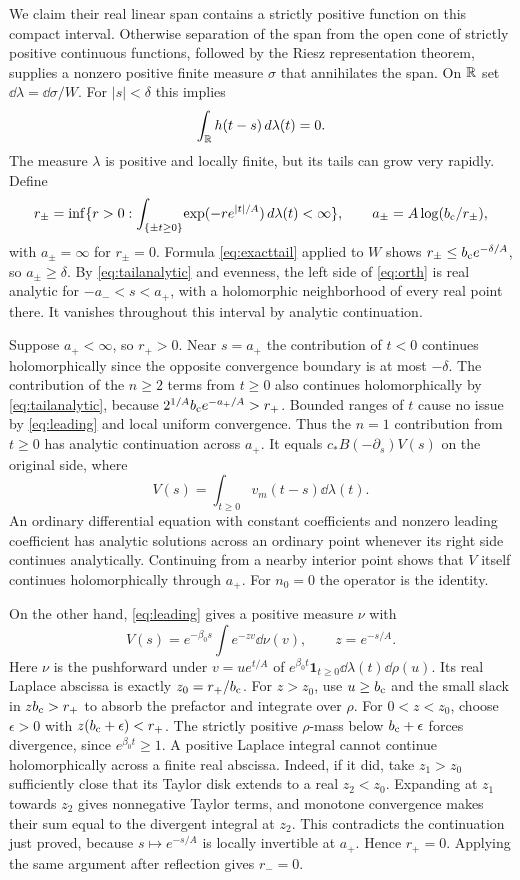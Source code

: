 We claim their real linear span contains a strictly positive function on this compact interval. Otherwise separation of the span from the open cone of strictly positive continuous functions, followed by the Riesz representation theorem, supplies a nonzero positive finite measure $\sigma$ that annihilates the span. On $\mathbb R$ set $\dd\lambda=\dd\sigma/W$. For $|s|<\delta$ this implies
\begin{equation}
                 \int_\mathbb R h(t-s)\,d\lambda(t)=0 .             \label{eq:orth}
\end{equation}
The measure $\lambda$ is positive and locally finite, but its tails can grow very rapidly. Define
\[
 r_\pm=\inf\{r>0:\int_{\{\pm t\ge0\}}\!
          \exp(-r e^{|t|/A})\,d\lambda(t)<\infty\},\qquad
 a_\pm=A\log(b_{\mathrm c}/r_\pm),
\]
with $a_\pm=\infty$ for $r_\pm=0$. Formula \eqref{eq:exacttail} applied to $W$ shows $r_\pm\le b_{\mathrm c} e^{-\delta/A}$, so $a_\pm\ge\delta$. By \eqref{eq:tailanalytic} and evenness, the left side of \eqref{eq:orth} is real analytic for $-a_-<s<a_+$, with a holomorphic neighborhood of every real point there. It vanishes throughout this interval by analytic continuation.

Suppose $a_+<\infty$, so $r_+>0$. Near $s=a_+$ the contribution of $t<0$ continues holomorphically since the opposite convergence boundary is at most $-\delta$. The contribution of the $n\ge2$ terms from $t\ge0$ also continues holomorphically by \eqref{eq:tailanalytic}, because
$2^{1/A}b_{\mathrm c} e^{-a_+/A}>r_+$.
Bounded ranges of $t$ cause no issue by \eqref{eq:leading} and local uniform convergence. Thus the $n=1$ contribution from $t\ge0$ has analytic continuation across $a_+$. It equals $c_*B(-\partial_s)V(s)$ on the original side, where
\[
 V(s)=\int_{t\ge0}v_m(t-s)\dd\lambda(t).
\]
An ordinary differential equation with constant coefficients and nonzero leading coefficient has analytic solutions across an ordinary point whenever its right side continues analytically. Continuing from a nearby interior point shows that $V$ itself continues holomorphically through $a_+$. For $n_0=0$ the operator is the identity.

On the other hand, \eqref{eq:leading} gives a positive measure $\nu$ with
\[
 V(s)=e^{-\beta_0s}\int e^{-zv}\dd\nu(v),\qquad z=e^{-s/A}.
\]
Here $\nu$ is the pushforward under $v=u e^{t/A}$ of
$e^{\beta_0 t}\mathbf1_{t\ge0}\dd\lambda(t)\dd\rho(u)$. Its real Laplace abscissa is exactly $z_0=r_+/b_{\mathrm c}$. For $z>z_0$, use $u\ge b_{\mathrm c}$ and the small slack in $zb_{\mathrm c}>r_+$ to absorb the prefactor and integrate over $\rho$. For $0<z<z_0$, choose $\epsilon>0$ with $z(b_{\mathrm c}+\epsilon)<r_+$. The strictly positive $\rho$-mass below $b_{\mathrm c}+\epsilon$ forces divergence, since $e^{\beta_0t}\ge1$. A positive Laplace integral cannot continue holomorphically across a finite real abscissa. Indeed, if it did, take $z_1>z_0$ sufficiently close that its Taylor disk extends to a real $z_2<z_0$. Expanding at $z_1$ towards $z_2$ gives nonnegative Taylor terms, and monotone convergence makes their sum equal to the divergent integral at $z_2$. This contradicts the continuation just proved, because $s\mapsto e^{-s/A}$ is locally invertible at $a_+$. Hence $r_+=0$. Applying the same argument after reflection gives $r_-=0$.

